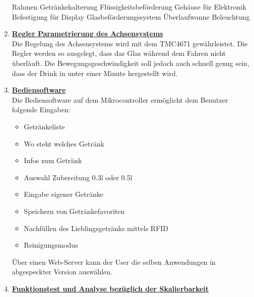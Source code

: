 \begin{enumerate}
\textbullet Rahmen \newline
\textbullet Getränkehalterung \newline
\textbullet Flüssigkeitsbeförderung \newline
\textbullet Gehäuse für Elektronik \newline
\textbullet Befestigung für Display \newline
\textbullet Glasbeförderungssystem \newline
\textbullet Überlaufwanne \newline
\textbullet Beleuchtung\\
\newpage

\item \underline{\textbf{Regler Parametrierung des Achsensystems}}\mbox{}\\

Die Regelung des Achsensystems wird mit dem TMC4671 gewährleistet. Die Regler werden so ausgelegt, dass das Glas während dem Fahren nicht überläuft. Die Bewegungsgeschwindigkeit soll jedoch auch schnell genug sein, dass der Drink in unter einer Minute hergestellt wird.\\

\item \underline{\textbf{Bediensoftware}}\mbox{}\\

Die Bediensoftware auf dem Mikrocontroller ermöglicht dem Benutzer folgende Eingaben:\\
\begin{itemize}

\item Getränkeliste
\item Wo steht welches Getränk
\item Infos zum Getränk
\item Auswahl Zubereitung 0.3l oder 0.5l
\item Eingabe eigener Getränke
\item Speichern von Getränkefavoriten
\item Nachfüllen des Lieblingsgetränks mittels RFID
\item Reinigungsmodus\\
\end{itemize}

Über einen Web-Server kann der User die selben Anwendungen in abgespeckter Version auswählen.\\

\item \underline{\textbf{Funktionstest und Analyse bezüglich der Skalierbarkeit}}\mbox{}\\
			

\end{enumerate}
